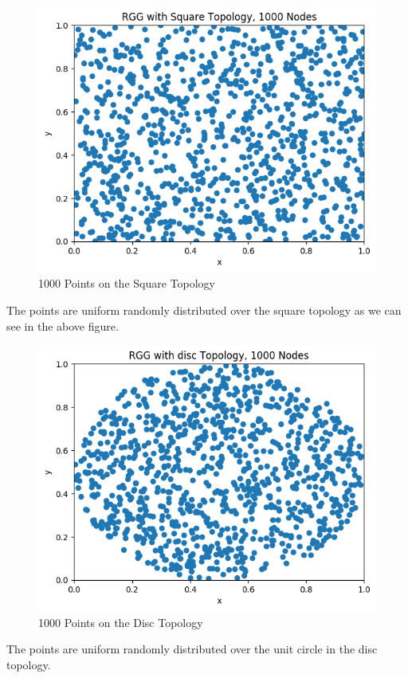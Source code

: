 \documentclass{article}
\begin{document}
    \begin{figure}[H]
      \centering
      \includegraphics[width=1 \textwidth]{square/drawing/nodes.png}
      \caption{1000 Points on the Square Topology}
    \end{figure}
    The points are uniform randomly distributed over the square topology as we can see in the above figure.
    \begin{figure}[H]
      \centering
      \includegraphics[width=1 \textwidth]{disc/drawing/nodes.png}
      \caption{1000 Points on the Disc Topology}
    \end{figure}
    The points are uniform randomly distributed over the unit circle in the disc topology.
\end{document}
